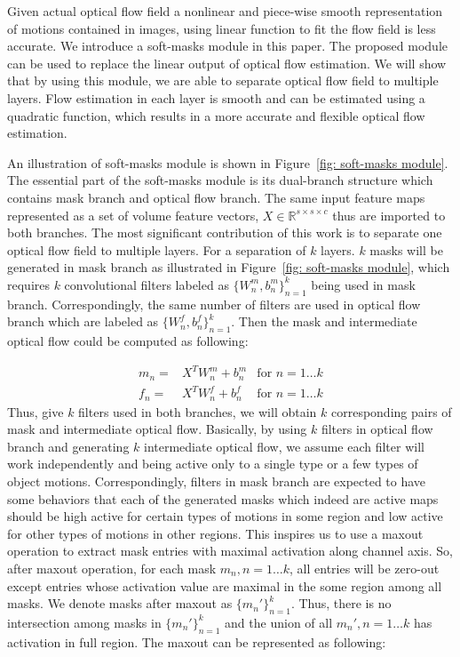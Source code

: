\documentclass[10pt,twocolumn,letterpaper]{article}
\begin{document}
Given actual optical flow field a nonlinear and piece-wise smooth representation of motions contained in images, using linear function to fit the flow field is less accurate. We introduce a soft-masks module in this paper. The proposed module can be used to replace the linear output of optical flow estimation. We will show that by using this module, we are able to separate optical flow field to multiple layers. Flow estimation in each layer is smooth and can be estimated using a quadratic function, which results in a more accurate and flexible optical flow estimation. 

An illustration of soft-masks module is shown in Figure~\ref{fig: soft-masks module}. The essential part of the soft-masks module is its dual-branch structure which contains mask branch and optical flow branch. The same input feature maps represented as a set of volume feature vectors, $X \in \mathbb{R}^{s\times s \times c}$ thus are imported to both branches. The most significant contribution of this work is to separate one optical flow field to multiple layers. For a separation of $k$ layers. $k$ masks will be generated in mask branch as illustrated in Figure~\ref{fig: soft-masks module}, which requires $k$ convolutional filters labeled as $\{W_n^m, b_n^m\}_{n=1}^k$ being used in mask branch. Correspondingly, the same number of filters are used in optical flow branch which are labeled as $\{W_n^f, b_n^f\}_{n=1}^k$. Then the mask and intermediate optical flow could be computed as following:

\begin{align}
\label{eqn: computation of masks and flows}
m_n =& X^T W_n^m + b_n^m &\! \text{for $n = 1\dots k$} \nonumber\\
f_n =& X^T W_n^f + b_n^f &\! \text{for $n = 1\dots k$}
\end{align}
Thus, give $k$ filters used in both branches, we will obtain $k$ corresponding pairs of mask and intermediate optical flow. Basically, by using $k$ filters in optical flow branch and generating $k$ intermediate optical flow, we assume each filter will work independently and being active only to a single type or a few types of object motions. Correspondingly, filters in mask branch are expected to have some behaviors that each of the generated masks which indeed are active maps should be high active for certain types of motions in some region and low active for other types of motions in other regions. This inspires us to use a maxout operation to extract mask entries with maximal activation along channel axis. So, after maxout operation, for each mask $m_n, n=1\dots k$, all entries will be zero-out except entries whose activation value are maximal in the some region among all masks. We denote masks after maxout as $\{m_n'\}_{n=1}^k$. Thus, there is no intersection among masks in $\{m_n'\}_{n=1}^k$ and the union of all $m_n', n=1\dots k$ has activation in full region. The maxout can be represented as following:
\end{document}
